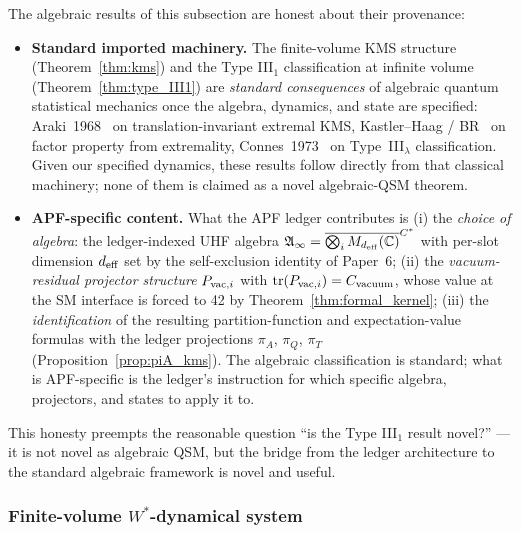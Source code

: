 \documentclass[11pt]{article}
\theoremstyle{plain}
\theoremstyle{definition}
\theoremstyle{remark}
\begin{document}
\begin{apfbox}[title={Standard imported machinery vs APF-specific content}]
\noindent The algebraic results of this subsection are honest about their provenance:
\begin{itemize}[leftmargin=2em,itemsep=2pt]
  \item \textbf{Standard imported machinery.}  The finite-volume KMS structure (Theorem~\ref{thm:kms}) and the Type III$_1$ classification at infinite volume (Theorem~\ref{thm:type_III1}) are \emph{standard consequences} of algebraic quantum statistical mechanics once the algebra, dynamics, and state are specified: Araki~1968~\cite{Araki1968KMS} on translation-invariant extremal KMS, Kastler--Haag / BR~\cite[Thm 4.3.17]{BratelliRobinson} on factor property from extremality, Connes~1973~\cite{Connes1973} on Type~III$_\lambda$ classification.  Given our specified dynamics, these results follow directly from that classical machinery; none of them is claimed as a novel algebraic-QSM theorem.
  \item \textbf{APF-specific content.}  What the APF ledger contributes is (i) the \emph{choice of algebra}: the ledger-indexed UHF algebra $\mathfrak{A}_\infty = \overline{\bigotimes_i M_{d_{\rm eff}}(\mathbb{C})}^{C^*}$ with per-slot dimension $d_{\rm eff}$ set by the self-exclusion identity of Paper~6; (ii) the \emph{vacuum-residual projector structure} $P_{{\rm vac},i}$ with $\mathrm{tr}(P_{{\rm vac},i}) = C_{\rm vacuum}$, whose value at the SM interface is forced to 42 by Theorem~\ref{thm:formal_kernel}; (iii) the \emph{identification} of the resulting partition-function and expectation-value formulas with the ledger projections $\pi_A$, $\pi_Q$, $\pi_T$ (Proposition~\ref{prop:piA_kms}).  The algebraic classification is standard; what is APF-specific is the ledger's instruction for which specific algebra, projectors, and states to apply it to.
\end{itemize}
This honesty preempts the reasonable question ``is the Type III$_1$ result novel?'' --- it is not novel as algebraic QSM, but the bridge from the ledger architecture to the standard algebraic framework is novel and useful.
\end{apfbox}

\bigskip

\subsubsection{Finite-volume $W^*$-dynamical system}\label{supp:H51}
\end{document}

